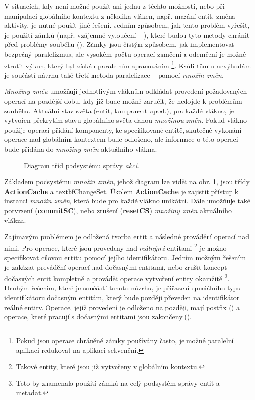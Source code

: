 V situacích, kdy není možné použít ani jednu z těchto možností, nebo při manipulaci globálního kontextu z několika vláken, např. mazání entit, změna aktivity, je nutné použít jiné řešení. Jedním způsobem, jak tento problém vyřešit, je použití zámků (např. vzájemné vyloučení -- ), které budou tyto metody chránit před problémy souběhu (). Zámky jsou čistým způsobem, jak implementovat bezpečný paralelizmus, ale vysokém počtu operací zamčení a odemčení je možné ztratit výkon, který byl získán paralelním zpracováním \footnote{Pokud jsou operace chráněné zámky používány často, je možné paralelní aplikaci redukovat na aplikaci sekvenční.}. Kvůli těmto nevýhodám je součástí návrhu také třetí metoda paralelizace -- pomocí \emph{množin změn}.

\emph{Množiny změn} umožňují jednotlivým vláknům odkládat provedení požadovaných operací na pozdější dobu, kdy již bude možné zaručit, že nedojde k problémům souběhu. Aktuální stav světa (entit, komponent apod.), pro každé vlákno, je vytvořen překrytím stavu globálního světa danou \emph{množinou změn}. Pokud vlákno použije operaci přidání komponenty, ke specifikované entitě, skutečné vykonání operace nad globálním kontextem bude odloženo, ale informace o této operaci bude přidána do \emph{množiny změn} aktuálního vlákna.

\begin{figure}[H]
	\caption{Diagram tříd podsystému správy \emph{akcí}.}
	\label{Fig:DESActionDiag}
\end{figure}

Základem podsystému \emph{množin změn}, jehož diagram lze vidět na obr. \ref{Fig:DESActionDiag}, jsou třídy \textbf{ActionCache} a textbf{ChangeSet}. Úkolem \textbf{ActionCache} je zajistit přístup k instanci \emph{množin změn}, která bude pro každé vlákno unikátní. Dále umožňuje také potvrzení (\textbf{commitSC}), nebo zrušení (\textbf{resetCS}) \emph{množiny změn} aktuálního vlákna. 

Zajímavým problémem je odložená tvorba entit a následné provádění operací nad nimi. Pro operace, které jsou provedeny nad \emph{reálnými} entitami \footnote{Takové entity, které jsou již vytvořeny v globálním kontextu.} je možno specifikovat cílovou entitu pomocí jejího identifikátoru. Jedním možným řešením je zakázat provádění operací nad dočasnými entitami, nebo zrušit koncept dočasných entit kompletně a provádět operace vytvoření entity okamžitě \footnote{Toto by znamenalo použití zámků na celý podsystém správy entit a metadat.}. Druhým řešením, které je součástí tohoto návrhu, je přiřazení speciálního typu identifikátoru dočasným entitám, který bude později převeden na identifikátor reálné entity. Operace, jejíž provedení je odloženo na později, mají postfix  () a operace, které pracují s dočasnými entitami jsou zakončeny  ().

